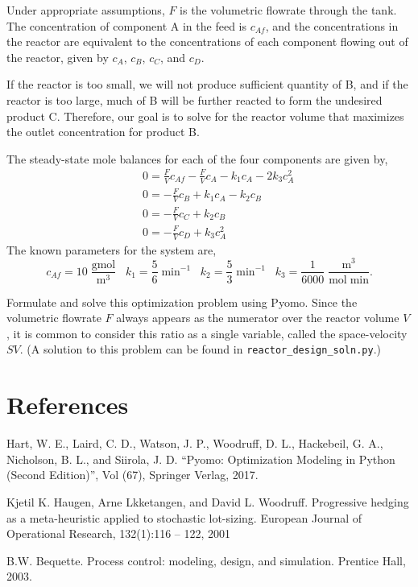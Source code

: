\documentclass[12pt]{article}
\begin{document}
\begin{description}
Under appropriate assumptions, $F$ is the volumetric flowrate through the tank. The concentration of component A in the feed is $c_{Af}$, and the concentrations in the reactor are equivalent to the concentrations of each component flowing out of the reactor, given by $c_A$, $c_B$, $c_C$, and $c_D$.

If the reactor is too small, we will not produce sufficient quantity of B, and if the reactor
is too large, much of B will be further
reacted to form the undesired product C. Therefore, our goal is
to solve for the reactor volume that maximizes the outlet
concentration for product B.

The steady-state mole balances for each of the four components are given by,
\begin{eqnarray*}
&&0 = \frac{F}{V} c_{Af} - \frac{F}{V} c_A - k_1 c_A -2 k_3 c_A^2\\
&&0 = -\frac{F}{V} c_B + k_1 c_A - k_2 c_B \\
&&0 = -\frac{F}{V} c_C + k_2 c_B \\
&&0 = -\frac{F}{V} c_D + k_3 c_A^2
\end{eqnarray*}
The known parameters for the system are,
\[
c_{Af}=10 \; \frac{\mbox{gmol}}{\mbox{m}^3} \;\;\; k_1{=} \frac{5}{6} \; \mbox{min}^{-1} \;\;\; k_2{=} \frac{5}{3} \; \mbox{min}^{-1} \;\;\; k_3{=} \frac{1}{6000} \; \frac{\mbox{m}^3}{ \mbox{mol}\; \mbox{min}}.
\]

Formulate and solve this optimization problem using Pyomo. Since the volumetric flowrate $F$ always appears as the numerator over the reactor volume $V$, it is common to consider this ratio
as a single variable, called the space-velocity $SV$. (A solution to this problem can be found in {\tt reactor\_design\_soln.py}.)
\end{description}



\section*{References}
Hart, W. E., Laird, C. D., Watson, J. P., Woodruff, D. L., Hackebeil, G. A., Nicholson, B. L., and Siirola, J. D. “Pyomo: Optimization Modeling in Python (Second Edition)”, Vol (67), Springer Verlag, 2017.

Kjetil K. Haugen, Arne Lkketangen, and David L. Woodruff. Progressive
hedging as a meta-heuristic applied to stochastic lot-sizing. European Journal
of Operational Research, 132(1):116 – 122, 2001

B.W. Bequette. Process control: modeling, design, and simulation. Prentice
Hall, 2003.
\end{document}
